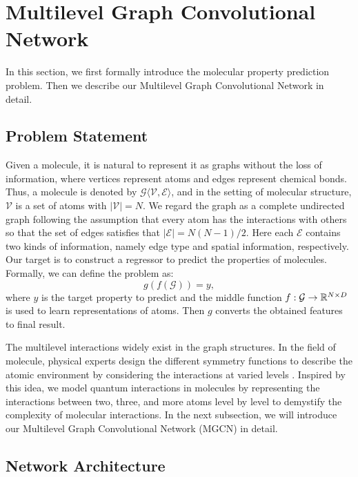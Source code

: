 \documentclass[letterpaper]{article} \usepackage{bm}
\begin{document}
\section{Multilevel Graph Convolutional Network}
In this section, we first formally introduce the molecular property prediction problem. Then we describe our Multilevel Graph Convolutional Network in detail.


\subsection{Problem Statement}
Given a molecule, it is natural to represent it as graphs without the loss of information, where vertices represent atoms and edges represent chemical bonds. Thus, a molecule is denoted by $\mathcal{G} \langle \mathcal{V}, \mathcal{E} \rangle$, and in the setting of molecular structure, $\mathcal{V}$  is a set of atoms with $|\mathcal{V}|=N$. We regard the graph as a complete undirected graph following the assumption that every atom has the interactions with others so that the set of edges satisfies that $|\mathcal{E}| = N(N-1)/2 $. Here each $\mathcal{E}$ contains two kinds of information, namely edge type and spatial information, respectively. Our target is to construct a regressor to predict the properties of molecules. Formally, we can define the problem as:  
 \begin{equation}
    g(f(\mathcal{G})) = y,  
\end{equation}   
where $y$ is the target property to predict and the middle function $f:\mathcal{G}\rightarrow \mathbb{R}^{N\scriptsize{\times}  D}$ is used to learn representations of atoms. Then $g$ converts the obtained features to final result.   

The multilevel interactions widely exist in the graph structures. In the field of molecule, physical experts design the different symmetry functions to describe the atomic environment by considering the interactions at varied levels \cite{behler2014representing}. Inspired by this idea, we model quantum interactions in molecules by representing the interactions between two, three, and more atoms level by level to demystify the complexity of molecular interactions. In the next subsection, we will introduce our Multilevel Graph Convolutional Network (MGCN) in detail.   


\subsection{Network Architecture}  
  
\end{document}
